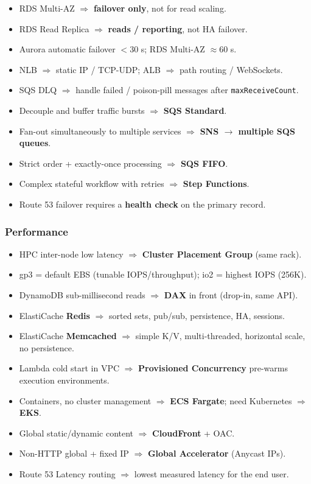 \begin{keyfacts}
\begin{itemize}
  \item RDS Multi-AZ $\Rightarrow$ \textbf{failover only}, not for read scaling.
  \item RDS Read Replica $\Rightarrow$ \textbf{reads / reporting}, not HA failover.
  \item Aurora automatic failover $<$30 s; RDS Multi-AZ $\approx$60 s.
  \item NLB $\Rightarrow$ static IP / TCP-UDP; ALB $\Rightarrow$ path routing / WebSockets.
  \item SQS DLQ $\Rightarrow$ handle failed / poison-pill messages after \texttt{maxReceiveCount}.
  \item Decouple and buffer traffic bursts $\Rightarrow$ \textbf{SQS Standard}.
  \item Fan-out simultaneously to multiple services $\Rightarrow$ \textbf{SNS $\to$ multiple SQS queues}.
  \item Strict order + exactly-once processing $\Rightarrow$ \textbf{SQS FIFO}.
  \item Complex stateful workflow with retries $\Rightarrow$ \textbf{Step Functions}.
  \item Route 53 failover requires a \textbf{health check} on the primary record.
\end{itemize}
\end{keyfacts}

\subsubsection{Performance}

\begin{keyfacts}
\begin{itemize}
  \item HPC inter-node low latency $\Rightarrow$ \textbf{Cluster Placement Group} (same rack).
  \item gp3 = default EBS (tunable IOPS/throughput); io2 = highest IOPS (256K).
  \item DynamoDB sub-millisecond reads $\Rightarrow$ \textbf{DAX} in front (drop-in, same API).
  \item ElastiCache \textbf{Redis} $\Rightarrow$ sorted sets, pub/sub, persistence, HA, sessions.
  \item ElastiCache \textbf{Memcached} $\Rightarrow$ simple K/V, multi-threaded, horizontal scale, no persistence.
  \item Lambda cold start in VPC $\Rightarrow$ \textbf{Provisioned Concurrency} pre-warms execution environments.
  \item Containers, no cluster management $\Rightarrow$ \textbf{ECS Fargate}; need Kubernetes $\Rightarrow$ \textbf{EKS}.
  \item Global static/dynamic content $\Rightarrow$ \textbf{CloudFront} + OAC.
  \item Non-HTTP global + fixed IP $\Rightarrow$ \textbf{Global Accelerator} (Anycast IPs).
  \item Route 53 Latency routing $\Rightarrow$ lowest measured latency for the end user.
\end{itemize}
\end{keyfacts}

